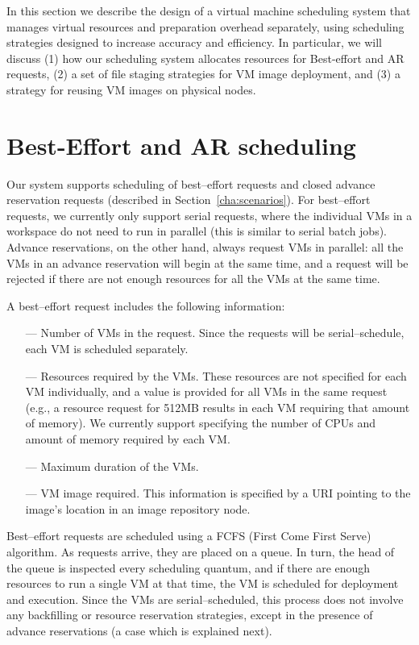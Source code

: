 In this section we describe the design of a virtual machine scheduling system that manages virtual resources and preparation overhead separately, using scheduling strategies designed to increase accuracy and efficiency. In particular, we will discuss (1) how our scheduling system allocates resources for Best-effort and AR requests, (2) a set of file staging strategies for VM image deployment, and (3) a strategy for reusing VM images on physical nodes.

\section{Best-Effort and AR scheduling}
\label{sec:scheduling}

Our system supports scheduling of best--effort requests and closed advance reservation requests (described in Section~\ref{cha:scenarios}). For best--effort requests, we currently only support serial requests, where the individual VMs in a workspace do not need to run in parallel (this is similar to serial batch jobs). Advance reservations, on the other hand, always request VMs in parallel: all the VMs in an advance reservation will begin at the same time, and a request will be rejected if there are not enough resources for all the VMs at the same time.

A best--effort request includes the following information:

\begin{itemize}
\item[---] Number of VMs in the request. Since the requests will be serial--schedule, each VM is scheduled separately.
\item[---] Resources required by the VMs. These resources are not specified for each VM individually, and a value is provided for all VMs in the same request (e.g., a resource request for 512MB results in each VM requiring that amount of memory). We currently support specifying the number of CPUs and amount of memory required by each VM.
\item[---] Maximum duration of the VMs.
\item[---] VM image required. This information is specified by a URI pointing to the image's location in an image repository node.
\end{itemize}

Best--effort requests are scheduled using a FCFS (First Come First Serve) algorithm. As requests arrive, they are placed on a queue. In turn, the head of the queue is inspected every scheduling quantum, and if there are enough resources to run a single VM at that time, the VM is scheduled for deployment and execution. Since the VMs are serial--scheduled, this process does not involve any backfilling or resource reservation strategies, except in the presence of advance reservations (a case which is explained next).

